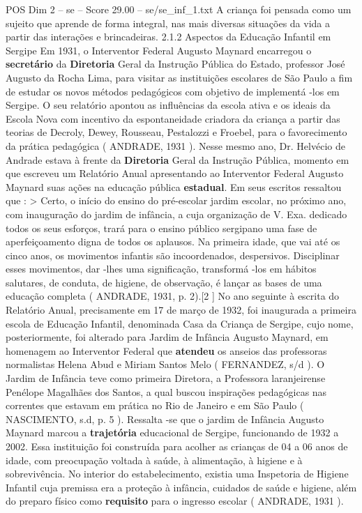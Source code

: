 \begin{textsample}{POS Dim 2 – se – Score 29.00 – se/se\_inf\_1.txt}
A criança foi pensada como um sujeito que aprende de forma integral, nas mais diversas situações da vida a partir das interações e brincadeiras. 2.1.2 Aspectos da Educação Infantil em Sergipe Em 1931, o Interventor Federal Augusto Maynard encarregou o \textbf{secretário} da \textbf{Diretoria} Geral da Instrução Pública do Estado, professor José Augusto da Rocha Lima, para visitar as instituições escolares de São Paulo a fim de estudar os novos métodos pedagógicos com objetivo de implementá -los em Sergipe.
O seu relatório apontou as influências da escola ativa e os ideais da Escola Nova com incentivo da espontaneidade criadora da criança a partir das teorias de Decroly, Dewey, Rousseau, Pestalozzi e Froebel, para o favorecimento da prática pedagógica ( ANDRADE, 1931 ).
Nesse mesmo ano, Dr.
Helvécio de Andrade estava à frente da \textbf{Diretoria} Geral da Instrução Pública, momento em que escreveu um Relatório Anual apresentando ao Interventor Federal Augusto Maynard suas ações na educação pública \textbf{estadual}.
Em seus escritos ressaltou que : > Certo, o início do ensino do pré-escolar jardim escolar, no próximo ano, com inauguração do jardim de infância, a cuja organização de V.
Exa. dedicado todos os seus esforços, trará para o ensino público sergipano uma fase de aperfeiçoamento digna de todos os aplausos.
Na primeira idade, que vai até os cinco anos, os movimentos infantis são incoordenados, despersivos.
Disciplinar esses movimentos, dar -lhes uma significação, transformá -los em hábitos salutares, de conduta, de higiene, de observação, é lançar as bases de uma educação completa ( ANDRADE, 1931, p. 2).[2 ] No ano seguinte à escrita do Relatório Anual, precisamente em 17 de março de 1932, foi inaugurada a primeira escola de Educação Infantil, denominada Casa da Criança de Sergipe, cujo nome, posteriormente, foi alterado para Jardim de Infância Augusto Maynard, em homenagem ao Interventor Federal que \textbf{atendeu} os anseios das professoras normalistas Helena Abud e Miriam Santos Melo ( FERNANDEZ, s/d ).
O Jardim de Infância teve como primeira Diretora, a Professora laranjeirense Penélope Magalhães dos Santos, a qual buscou inspirações pedagógicas nas correntes que estavam em prática no Rio de Janeiro e em São Paulo ( NASCIMENTO, s.d, p. 5 ).
Ressalta -se que o jardim de Infância Augusto Maynard marcou a \textbf{trajetória} educacional de Sergipe, funcionando de 1932 a 2002.
Essa instituição foi construída para acolher as crianças de 04 a 06 anos de idade, com preocupação voltada à saúde, à alimentação, à higiene e à sobrevivência.
No interior do estabelecimento, existia uma Inspetoria de Higiene Infantil cuja premissa era a proteção à infância, cuidados de saúde e higiene, além do preparo físico como \textbf{requisito} para o ingresso escolar ( ANDRADE, 1931 ).

\end{textsample}
